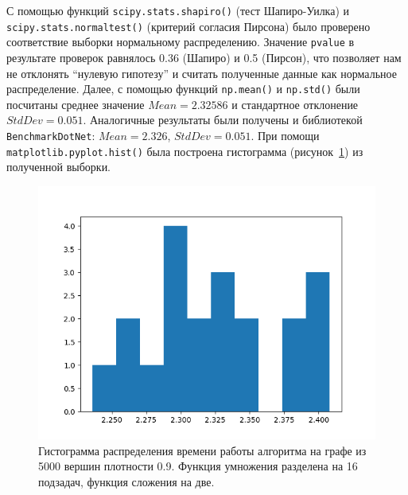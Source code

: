 \begin{table}[h]
\centering
    \caption{Замеры времени работы параллельной версии алгоритма на графе с 5000 вершинами плотности $0.9$. Функция умножения разделена на 16 подзадач, функция сложения на две. Время измерено в секундах.}
    \label{data}
\end{table}

С помощью функций \texttt{scipy.stats.shapiro()} (тест Шапиро-Уилка) и \texttt{scipy.stats.normaltest()} (критерий согласия Пирсона) было проверено соответствие выборки нормальному распределению. Значение \texttt{pvalue} в результате проверок равнялось 0.36 (Шапиро) и 0.5 (Пирсон), что позволяет нам не отклонять \enquote{нулевую гипотезу} и считать полученные данные как нормальное распределение. Далее, с помощью функций \texttt{np.mean()} и \texttt{np.std()} были посчитаны среднее значение $Mean = 2.32586$ и стандартное отклонение $StdDev = 0.051$. Аналогичные результаты были получены и библиотекой \texttt{BenchmarkDotNet}: $Mean = 2.326$, $StdDev = 0.051$. При помощи \texttt{matplotlib.pyplot.hist()} была построена гистограмма (рисунок~\ref{fig:plot}) из полученной выборки.

\begin{figure}[H]
    \centering
    \includegraphics[width=\textwidth]{figures/plot.png}
    \caption{Гистограмма распределения времени работы алгоритма на графе из 5000 вершин плотности 0.9. Функция умножения разделена на 16 подзадач, функция сложения на две.}
    \label{fig:plot}
\end{figure}

